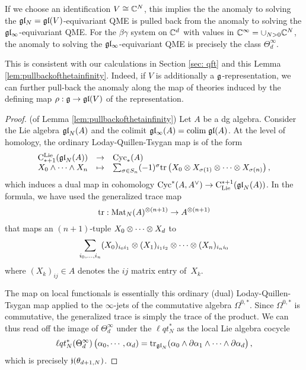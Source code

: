 If we choose an identification $V \cong \mathbb C^N$, this implies the the anomaly to solving the $\mathfrak{g} \mathfrak{l}_N = \mathfrak{g} \mathfrak{l}(V)$-equivariant QME is pulled back from the anomaly to solving the $\mathfrak{g} \mathfrak{l}_\infty$-equivariant QME. 
For the $\beta\gamma$ system on $\mathbb C^d$ with values in $\mathbb C^\infty = \cup_{N > 0} \mathbb C^N$, the anomaly to solving the $\mathfrak{g} \mathfrak{l}_\infty$-equivariant QME is precisely the class $\Theta_{d}^\infty$. 

This is consistent with our calculations in Section \ref{sec: qft} and this Lemma \ref{lem:pullbackofthetainfinity}. 
Indeed, if $V$ is additionally a $\mathfrak g$-representation, we can further pull-back the anomaly along the map of theories induced by the defining map $\rho : \mathfrak g \to {\mathfrak{gl}}(V)$ of the representation. 

\begin{proof}(of Lemma \ref{lem:pullbackofthetainfinity})
Let $A$ be a dg algebra.
Consider the Lie algebra ${\mathfrak{gl}}_N(A)$ and the colimit $\mathfrak{g} \mathfrak{l}_\infty(A) = {\rm colim} \; {\mathfrak{gl}} (A)$. 
At the level of homology, the ordinary Loday-Quillen-Tsygan map is of the form
\[
\begin{array}{ccl}
{\rm C}^{\rm Lie}_{*+1}({\mathfrak{gl}}_N(A)) & \to & {\rm Cyc}_{*}(A) \\
X_0 \wedge \cdots \wedge X_n & \mapsto & \sum_{\sigma \in S_n} (-1)^{\sigma} {\rm tr} \left(X_0 \otimes X_{\sigma(1)} \otimes\cdots \otimes X_{\sigma(n)} \right), 
\end{array}
\] 
which induces a dual map in cohomology ${\rm Cyc}^*(A, A^\vee) \to {\rm C}_{{\rm Lie}}^{*+1}({\mathfrak{gl}}_N(A))$. 
In the formula, we have used the generalized trace map
\[
{\rm tr} : {\rm Mat}_N(A)^{\otimes(n+1)} \to A^{\otimes (n+1)} 
\]
that maps an $(n+1)$-tuple $X_0\otimes \cdots \otimes X_d$ to 
\[
\sum_{i_0,\ldots,i_n} (X_0)_{i_0 i_1} \otimes (X_1)_{i_1i_2} \otimes \cdots \otimes (X_n)_{i_n i_0}
\]
where $(X_k)_{ij} \in A$ denotes the $ij$ matrix entry of~$X_k$.

The map on local functionals is essentially this ordinary (dual) Loday-Quillen-Tsygan map applied to the $\infty$-jets of the commutative algebra $\Omega^{0,*}$. 
Since $\Omega^{0,*}$ is commutative, the generalized trace is simply the trace of the product.
We can thus read off the image of $\Theta^\infty_d$ under the $\ell q t_N^*$ as the local Lie algebra cocycle
\begin{align*}
\ell q t_N^*(\Theta_d^\infty)\left(\alpha_0, \cdots, \alpha_d) = {\rm tr}_{{\mathfrak{gl}}_N}(\alpha_0 \wedge \partial \alpha_1\wedge \cdots \wedge \partial \alpha_d\right),
\end{align*}
which is precisely $\mathfrak j(\theta_{d+1,N})$. 
\end{proof}

